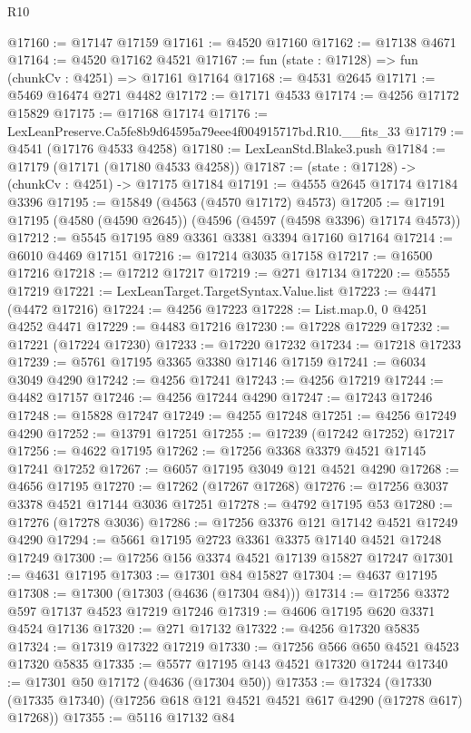 \begin{lexlean}{R10}
\begin{coremodule}
@17160 := @17147 @17159
@17161 := @4520 @17160
@17162 := @17138 @4671
@17164 := @4520 @17162 @4521
@17167 := fun (state : @17128) => fun (chunkCv : @4251) => @17161 @17164
@17168 := @4531 @2645
@17171 := @5469 @16474 @271 @4482
@17172 := @17171 @4533
@17174 := @4256 @17172 @15829
@17175 := @17168 @17174
@17176 := LexLeanPreserve.Ca5fe8b9d64595a79eee4f004915717bd.R10.__fits_33
@17179 := @4541 (@17176 @4533 @4258)
@17180 := LexLeanStd.Blake3.push
@17184 := @17179 (@17171 (@17180 @4533 @4258))
@17187 := (state : @17128) -> (chunkCv : @4251) -> @17175 @17184
@17191 := @4555 @2645 @17174 @17184 @3396
@17195 := @15849 (@4563 (@4570 @17172) @4573)
@17205 := @17191 @17195 (@4580 (@4590 @2645)) (@4596 (@4597 (@4598 @3396) @17174 @4573))
@17212 := @5545 @17195 @89 @3361 @3381 @3394 @17160 @17164
@17214 := @6010 @4469 @17151
@17216 := @17214 @3035 @17158
@17217 := @16500 @17216
@17218 := @17212 @17217
@17219 := @271 @17134
@17220 := @5555 @17219
@17221 := LexLeanTarget.TargetSyntax.Value.list
@17223 := @4471 (@4472 @17216)
@17224 := @4256 @17223
@17228 := List.map.{0, 0} @4251 @4252 @4471
@17229 := @4483 @17216
@17230 := @17228 @17229
@17232 := @17221 (@17224 @17230)
@17233 := @17220 @17232
@17234 := @17218 @17233
@17239 := @5761 @17195 @3365 @3380 @17146 @17159
@17241 := @6034 @3049 @4290
@17242 := @4256 @17241
@17243 := @4256 @17219
@17244 := @4482 @17157
@17246 := @4256 @17244 @4290
@17247 := @17243 @17246
@17248 := @15828 @17247
@17249 := @4255 @17248
@17251 := @4256 @17249 @4290
@17252 := @13791 @17251
@17255 := @17239 (@17242 @17252) @17217
@17256 := @4622 @17195
@17262 := @17256 @3368 @3379 @4521 @17145 @17241 @17252
@17267 := @6057 @17195 @3049 @121 @4521 @4290
@17268 := @4656 @17195
@17270 := @17262 (@17267 @17268)
@17276 := @17256 @3037 @3378 @4521 @17144 @3036 @17251
@17278 := @4792 @17195 @53
@17280 := @17276 (@17278 @3036)
@17286 := @17256 @3376 @121 @17142 @4521 @17249 @4290
@17294 := @5661 @17195 @2723 @3361 @3375 @17140 @4521 @17248 @17249
@17300 := @17256 @156 @3374 @4521 @17139 @15827 @17247
@17301 := @4631 @17195
@17303 := @17301 @84 @15827
@17304 := @4637 @17195
@17308 := @17300 (@17303 (@4636 (@17304 @84)))
@17314 := @17256 @3372 @597 @17137 @4523 @17219 @17246
@17319 := @4606 @17195 @620 @3371 @4524 @17136
@17320 := @271 @17132
@17322 := @4256 @17320 @5835
@17324 := @17319 @17322 @17219
@17330 := @17256 @566 @650 @4521 @4523 @17320 @5835
@17335 := @5577 @17195 @143 @4521 @17320 @17244
@17340 := @17301 @50 @17172 (@4636 (@17304 @50))
@17353 := @17324
    (@17330 (@17335 @17340) (@17256 @618 @121 @4521 @4521 @617 @4290 (@17278 @617) @17268))
@17355 := @5116 @17132 @84

\end{coremodule}
\end{lexlean}
